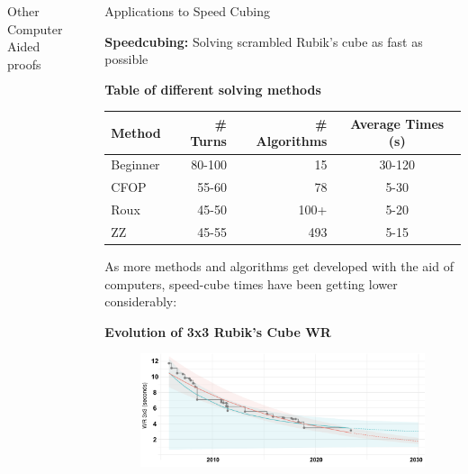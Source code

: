 \documentclass[final]{beamer}
\newlength{\sepwidth}
\newlength{\colwidth}
\newcommand{\separatorcolumn}{\begin{column}{\sepwidth}\end{column}}
\begin{document}
\begin{frame}[t]
\begin{columns}[t]
\begin{column}{\colwidth}
\begin{block}{Other Computer Aided proofs}
  \end{block}

\end{column}

\separatorcolumn

\begin{column}{\colwidth}

  \begin{block}{Applications to Speed Cubing}


    \large \textbf{Speedcubing:} Solving scrambled Rubik's cube as fast as possible

    \begin{center}
      \textbf{Table of different solving methods}
    \end{center}
    \begin{table}
      \centering
      \begin{tabular}{l r r c}
        \toprule
        \textbf{Method} & \textbf{\# Turns} & \textbf{\# Algorithms} & \textbf{Average Times (s)} \\
        \midrule
        Beginner & 80-100 & 15 & 30-120 \\
        CFOP & 55-60 & 78 & 5-30 \\
        Roux & 45-50 & 100+ & 5-20 \\
        ZZ & 45-55 & 493 & 5-15 \\
        \bottomrule
      \end{tabular}
    \end{table}


  As more methods and algorithms get developed with the aid of computers,
  speed-cube times have been getting lower considerably:

  \begin{center}
    \textbf{Evolution of 3x3 Rubik's Cube WR}
  \end{center}

  \begin{figure}
    \centering
      \includegraphics[width=1.0\textwidth]{logos/solveprogression.png}
  \end{figure}


\end{block}
\end{column}
\end{columns}
\end{frame}
\end{document}
